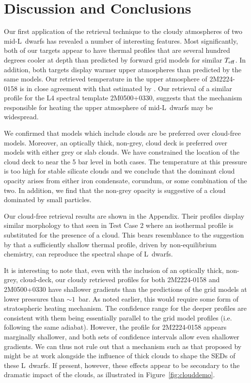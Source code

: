 \documentclass[useAMS,usenatbib]{mn2e}
\begin{document}
\section{Discussion and Conclusions}
\label{sec:conc}

Our first application of the retrieval technique to the cloudy atmospheres of two mid-L~dwarfs has revealed a number of interesting features. Most significantly, both of our targets appear to have thermal profiles that are several hundred degrees cooler at depth than predicted by forward grid models for similar $T_{\rm eff}$. In addition, both targets display warmer upper atmospheres than predicted by the same models.  Our retrieved temperature in the upper atmosphere of 2M2224-0158 is in close agreement with that estimated by \citet{sorahana2014}. Our retrieval of a similar profile for the L4 spectral template 2M0500+0330, suggests that the mechanism responsible for heating the upper atmosphere of mid-L~dwarfs may be widespread. 

We confirmed that models which include clouds are be preferred over cloud-free models. Moreover, an optically thick, non-grey, cloud deck is preferred over models with either grey or slab clouds. We have constrained the location of the cloud deck to near the 5 bar level in both cases. The temperature at this pressure is too high for stable silicate clouds and we conclude that the dominant cloud opacity arises from either iron condensate, corundum, or some combination of the two. In addition, we find that the non-grey opacity is suggestive of a cloud dominated by small particles. 

 Our cloud-free retrieval results are shown in the Appendix. Their profiles display similar morphology to that seen in Test Case 2 where an isothermal profile is substituted for the presence of a cloud. This bears resemblance to the suggestion by \citet{tremblin2015,tremblin2016} that a sufficiently shallow thermal profile, driven by non-equilibrium chemistry, can reproduce the spectral shape of L~dwarfs.  
 
 
It is interesting to note that, even with the inclusion of an optically thick, non-grey, cloud-deck, our cloudy retrieved profiles for both 2M2224-0158 and 2M0500+0330 have shallower gradients than the predictions of the grid models at lower pressures than $\sim 1$~bar.  As noted earlier, this would require some form of stratospheric heating mechanism. 
The confidence range for the deeper profiles are consistent with them being essentially parallel to the grid model profiles (i.e. following the same adiabat). However, the profile for 2M2224-0158 appears marginally shallower, and both sets of confidence intervals allow even shallower gradients. We can thus not rule out that a mechanism such as that proposed by \citet{tremblin2015,tremblin2016} might be at work alongside the influence of thick clouds to shape the SEDs of these L~dwarfs. If present, however, these effects appear to be secondary  to the dramatic impact of the clouds, as illustrated in Figure~\ref{fig:clouddemo}.
\end{document}
